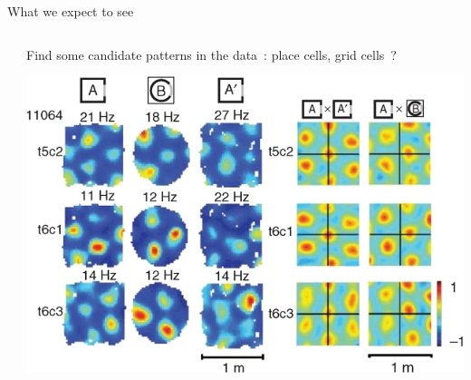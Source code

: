 \documentclass[bigger]{beamer}
\begin{document}
\begin{frame}[label={sec:orgd621130}]{What we expect to see}
\begin{columns}
\begin{column}{0.5\columnwidth}
\end{column}
\begin{column}{0.5\columnwidth}
\center
\scriptsize
Find some candidate patterns in the data~: place cells, grid cells~?
\normalsize
\begin{center}
\includegraphics[height=0.25\textheight]{img/place-cells-grid-cells.jpg.png}
\end{center}


\end{column}
\end{columns}
\end{frame}
\end{document}
